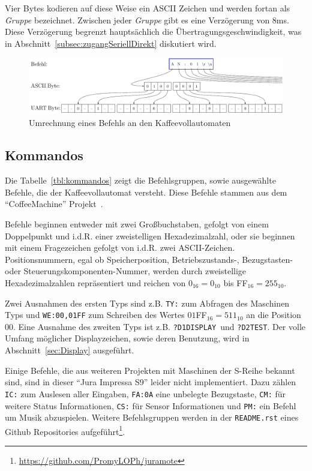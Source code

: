 Vier Bytes kodieren auf diese Weise ein \ac{ASCII} Zeichen und werden fortan als \textit{Gruppe} bezeichnet.
Zwischen jeder \textit{Gruppe} gibt es eine Verzögerung von 8ms.
Diese Verzögerung begrenzt hauptsächlich die Übertragungsgeschwindigkeit, was in Abschnitt~\ref{subsec:zugangSeriellDirekt} diskutiert wird.

\begin{figure}
  \begin{center}
    \includegraphics[scale=0.6]{images/chapter_3/UART-Bytes}
    \caption{Umrechnung eines Befehls an den Kaffeevollautomaten}
    \label{fig:uart}
  \end{center}
\end{figure}

\subsection{Kommandos}\label{subsec:Kommandos}
Die Tabelle~\ref{tbl:kommandos} zeigt die Befehlsgruppen, sowie ausgewählte Befehle, die der Kaffeevollautomat versteht.
Diese Befehle stammen aus dem "`CoffeeMachine"' Projekt~\cite{GitCoffeeMachine}.

Befehle beginnen entweder mit zwei Großbuchstaben, gefolgt von einem Doppelpunkt und i.d.R. einer zweistelligen Hexadezimalzahl, oder sie beginnen mit einem Fragezeichen gefolgt von i.d.R. zwei \ac{ASCII}-Zeichen.
Positionsnummern, egal ob Speicherposition, \mbox{Betriebszustands-,} Bezugstasten- oder Steuerungskomponenten-Nummer, werden durch zweistellige Hexadezimalzahlen repräsentiert und reichen von $0_{16}=0_{10}$ bis FF$_{16}=255_{10}$.

Zwei Ausnahmen des ersten Typs sind z.B. \texttt{TY:} zum Abfragen des Maschinen Typs und \texttt{WE:00,01FF} zum Schreiben des Wertes $01$FF$_{16} = 511_{10}$ an die Position $00$.
Eine Ausnahme des zweiten Typs ist z.B. \texttt{?D1DISPLAY}\textvisiblespace\ und \texttt{?D2}\textvisiblespace\textvisiblespace\texttt{TEST}\textvisiblespace\textvisiblespace.
Der volle Umfang möglicher Displayzeichen, sowie deren Benutzung, wird in Abschnitt~\ref{sec:Display} ausgeführt.

Einige Befehle, die aus weiteren Projekten mit Maschinen der S-Reihe bekannt sind, sind in dieser "`Jura Impressa S9"' leider nicht implementiert.
Dazu zählen \texttt{IC:} zum Auslesen aller Eingaben, \texttt{FA:0A} eine unbelegte Bezugstaste, \texttt{CM:} für weitere Status Informationen, \texttt{CS:} für Sensor Informationen und \texttt{PM:} ein Befehl um Musik abzuspielen.
Weitere Befehlsgruppen werden in der \texttt{README.rst} eines Github Repositories aufgeführt\footnote{\url{https://github.com/PromyLOPh/juramote}}.

